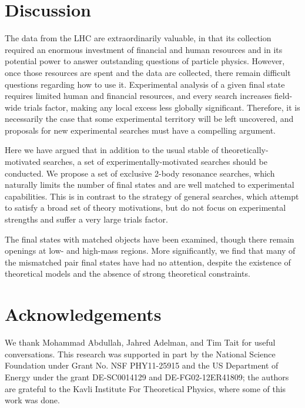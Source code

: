 \section{Discussion}

The data from the LHC are extraordinarily valuable, in that its collection required an enormous investment of financial and human resources and in its potential power to answer outstanding questions of particle physics.  However, once those resources are spent and the data are collected, there remain difficult questions regarding how to use it. Experimental analysis of a given final state requires limited human and financial resources, and every search increases field-wide trials factor, making any local excess less globally significant.  Therefore, it is necessarily the case that some experimental territory will be left uncovered, and proposals for new experimental searches must have a  compelling argument.

Here we have argued that in addition to the usual stable of theoretically-motivated searches, a set of experimentally-motivated searches should be conducted.  We propose a set of exclusive 2-body resonance searches, which naturally limits the number of final states and are well matched to experimental capabilities. This is in contrast to the strategy of general searches, which attempt to satisfy a broad set of theory motivations, but do not focus on experimental strengths and suffer a very large trials factor.

The final states with matched objects have been examined, though there remain openings at low- and high-mass regions. More significantly, we find that many of the mismatched pair final states have had no attention, despite the existence of theoretical models and the absence of strong theoretical constraints. \\


\section*{Acknowledgements}

We thank Mohammad Abdullah, Jahred Adelman, and Tim Tait for useful conversations. This research was supported in part by the National Science Foundation under Grant No. NSF PHY11-25915 and the US Department of Energy under the grant DE-SC0014129 and DE-FG02-12ER41809; the authors are grateful to the Kavli Institute For Theoretical Physics, where some of this work was done.

%
%



